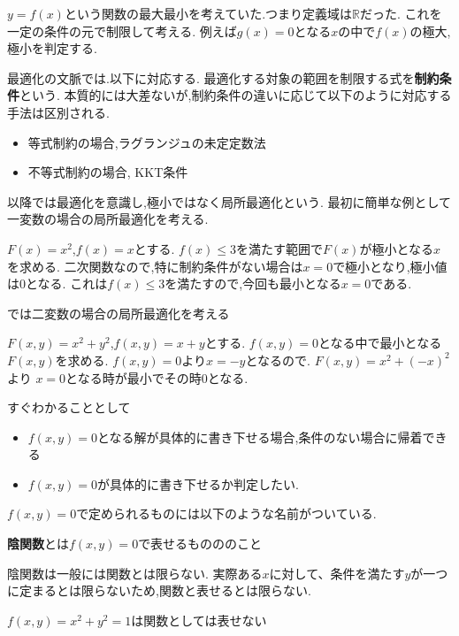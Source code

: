 $y=f(x)$という関数の最大最小を考えていた.つまり定義域は$\mathbb{R}$だった.
これを一定の条件の元で制限して考える.
例えば$g(x) = 0$となる$x$の中で$f(x)$の極大,極小を判定する.

\begin{rem}
最適化の文脈では.以下に対応する.
最適化する対象の範囲を制限する式を\textbf{制約条件}という.
本質的には大差ないが,制約条件の違いに応じて以下のように対応する手法は区別される.
\begin{itemize}
  \item 等式制約の場合,ラグランジュの未定定数法
  \item 不等式制約の場合, KKT条件
\end{itemize}
\end{rem}


以降では最適化を意識し,極小ではなく局所最適化という.
最初に簡単な例として一変数の場合の局所最適化を考える.
\begin{epl}
$F(x) = x^2$,$f(x) = x$とする.
$f(x) \le 3$を満たす範囲で$F(x)$が極小となる$x$を求める.
二次関数なので,特に制約条件がない場合は$x = 0$で極小となり,極小値は0となる.
これは$f(x) \le 3$を満たすので,今回も最小となる$x=0$である.
\end{epl}

では二変数の場合の局所最適化を考える
\begin{epl}
$F(x, y) = x^2 + y^2$,$f(x, y) = x + y$とする.
$f(x ,y) = 0$となる中で最小となる$F(x, y)$を求める.
$f(x, y) = 0$より$x = -y$となるので.
$F(x , y) = x^2 + (-x)^2$より
$x = 0$となる時が最小でその時0となる.
\end{epl}

すぐわかることとして
\begin{itemize}
  \item $f(x, y) = 0$となる解が具体的に書き下せる場合,条件のない場合に帰着できる
  \item  $f(x ,y) = 0$が具体的に書き下せるか判定したい.
\end{itemize}

$f(x,y) = 0$で定められるものには以下のような名前がついている.
\begin{dfn}
\textbf{陰関数}とは$f(x, y) = 0$で表せるものののこと
\end{dfn}

\begin{rem}
陰関数は一般には関数とは限らない.
実際ある$x$に対して、条件を満たす$y$が一つに定まるとは限らないため,関数と表せるとは限らない.
\end{rem}

\begin{epl}
$f(x , y) = x^2 + y^2 = 1$は関数としては表せない
\end{epl}

